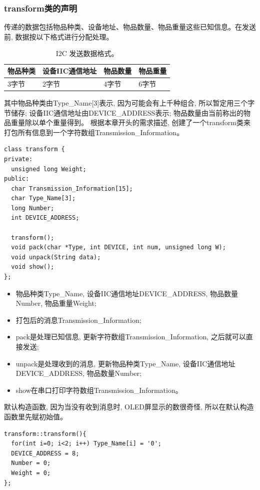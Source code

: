 \documentclass{article}
\begin{document}
\subsubsection{transform类的声明}
传递的数据包括物品种类、设备地址、物品数量、物品重量这些已知信息。在发送前, 数据按以下格式进行分配处理。

\begin{table}[h]
  \centering
  \begin{tabularx}{\textwidth}{|X|X|X|X|}
    \hline
    物品种类 & 设备IIC通信地址 & 物品数量 & 物品重量  \\
    \hline
    3字节 & 2字节 & 4字节 & 6字节 \\
    \hline
  \end{tabularx}
  \caption{I2C 发送数据格式。}
  \label{tab:example}
\end{table}

其中物品种类由Type\_Name[3]表示, 因为可能会有上千种组合, 所以暂定用三个字节储存; 设备IIC通信地址由DEVICE\_ADDRESS表示; 物品数量由当前称出的物品重量除以单个重量得到。
根据本章开头的需求描述, 创建了一个transform类来打包所有信息到一个字符数组Transmission\_Information。

\begin{lstlisting}
class transform {
private:
  unsigned long Weight;
public:
  char Transmission_Information[15];
  char Type_Name[3];
  long Number;
  int DEVICE_ADDRESS;

  transform();
  void pack(char *Type, int DEVICE, int num, unsigned long W);
  void unpack(String data);
  void show();
};
\end{lstlisting}

\begin{itemize}
  \item 物品种类Type\_Name, 设备IIC通信地址DEVICE\_ADDRESS, 物品数量Number, 物品重量Weight;
  \item 打包后的消息Transmission\_Information;
  \item pack是处理已知信息, 更新字符数组Transmission\_Information, 之后就可以直接发送;
  \item unpack是处理收到的消息, 更新物品种类Type\_Name, 设备IIC通信地址DEVICE\_ADDRESS, 物品数量Number;
  \item show在串口打印字符数组Transmission\_Information。
\end{itemize}

默认构造函数, 因为当没有收到消息时, OLED屏显示的数很奇怪, 所以在默认构造函数里先赋初始值。
\begin{lstlisting}
transform::transform(){
  for(int i=0; i<2; i++) Type_Name[i] = '0';
  DEVICE_ADDRESS = 8;
  Number = 0;
  Weight = 0;
};
\end{lstlisting}
\end{document}
